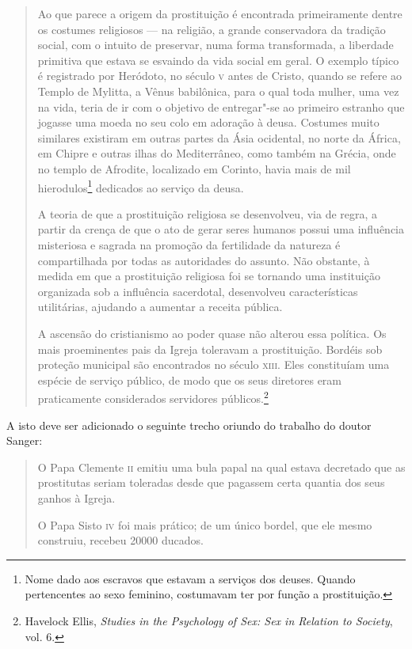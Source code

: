 \begin{quote}
Ao que parece a origem da prostituição é encontrada
primeiramente dentre os costumes religiosos --- na religião, a grande
conservadora da tradição social, com o intuito de preservar, numa forma transformada, a
liberdade primitiva que estava se esvaindo da vida social em geral. O
exemplo típico é registrado por Heródoto, no século \textsc{v} antes de Cristo,
quando se refere ao Templo de Mylitta, a Vênus babilônica, para o qual toda mulher,
uma vez na vida, teria de ir com o objetivo de entregar"-se ao primeiro estranho que jogasse uma
moeda no seu colo em adoração à deusa. Costumes muito similares
existiram em outras partes da Ásia ocidental, no norte da África, em
Chipre e outras ilhas do Mediterrâneo, como também na Grécia, onde no
templo de Afrodite, localizado em Corinto, havia mais de mil
hierodulos\footnote{Nome dado aos escravos que estavam a serviços dos
  deuses. Quando pertencentes ao sexo feminino, costumavam
  ter por função a prostituição.}
dedicados ao serviço da deusa.

A teoria de que a prostituição religiosa se desenvolveu, via de regra,
a partir da crença de que o ato de gerar seres humanos possui uma
influência misteriosa e sagrada na promoção da fertilidade da natureza
é compartilhada por todas as autoridades do assunto. Não obstante, à
medida em que a prostituição religiosa foi se tornando uma instituição
organizada sob a influência sacerdotal, desenvolveu características
utilitárias, ajudando a aumentar a receita pública.

A ascensão do cristianismo ao poder quase não
alterou essa política. Os mais proeminentes pais da Igreja toleravam a
prostituição. Bordéis sob proteção municipal são encontrados no século
\textsc{xiii}. Eles constituíam uma espécie de serviço público, de modo que os
seus diretores eram praticamente considerados servidores
públicos.\footnote{Havelock Ellis,
  \emph{Studies in the Psychology of Sex: Sex in Relation to Society},
  vol. 6.}
  \end{quote}

A isto deve ser adicionado o seguinte trecho oriundo do trabalho do
doutor Sanger:

\begin{quote}
O Papa Clemente \textsc{ii} emitiu uma bula papal na qual estava decretado que
as prostitutas seriam toleradas desde que pagassem certa quantia dos
seus ganhos à Igreja.

O Papa Sisto \textsc{iv} foi mais prático; de um único bordel, que ele mesmo
construiu, recebeu 20000 ducados.
\end{quote}

